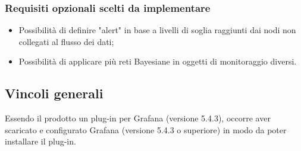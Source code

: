 		        \subsubsection{Requisiti opzionali scelti da implementare}
				\begin{itemize}
					\item Possibilità di definire "alert" in base a livelli di soglia raggiunti dai nodi non collegati al flusso dei dati;
					\item Possibilità di applicare più reti Bayesiane in oggetti di monitoraggio diversi.
	        		\end{itemize}
				
				
			\subsection{Vincoli generali}			
Essendo il prodotto un plug-in per Grafana (versione 5.4.3), occorre aver scaricato e configurato Grafana (versione 5.4.3 o superiore) in modo da poter installare il plug-in.


\newpage
